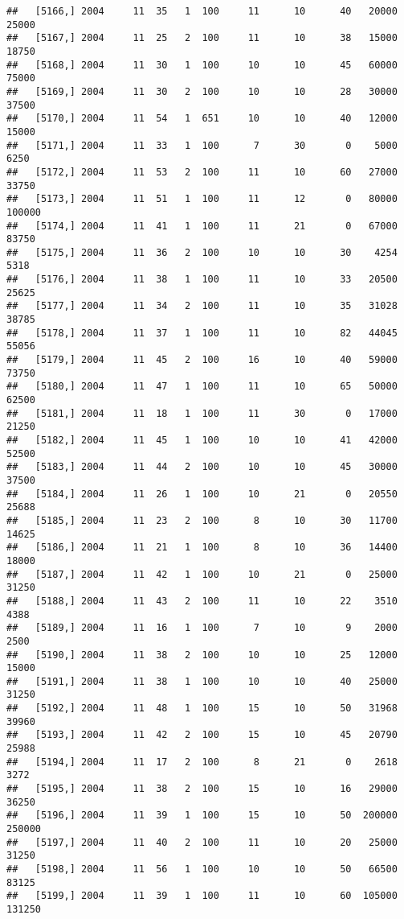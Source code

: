 \documentclass{article}\usepackage[]{graphicx}\usepackage[]{color}
\makeatletter
\newenvironment{kframe}{%
 \def\at@end@of@kframe{}%
 \ifinner\ifhmode%
  \def\at@end@of@kframe{\end{minipage}}%
  \begin{minipage}{\columnwidth}%
 \fi\fi%
 \def\FrameCommand##1{\hskip\@totalleftmargin \hskip-\fboxsep
 \colorbox{shadecolor}{##1}\hskip-\fboxsep
     \hskip-\linewidth \hskip-\@totalleftmargin \hskip\columnwidth}%
 \MakeFramed {\advance\hsize-\width
   \@totalleftmargin\z@ \linewidth\hsize
   \@setminipage}}%
 {\par\unskip\endMakeFramed%
 \at@end@of@kframe}
\newenvironment{knitrout}{}{} %
\makeatother
\begin{document}
\begin{knitrout}
\begin{kframe}
\begin{verbatim}
##   [5166,] 2004     11  35   1  100     11      10      40   20000   25000
##   [5167,] 2004     11  25   2  100     11      10      38   15000   18750
##   [5168,] 2004     11  30   1  100     10      10      45   60000   75000
##   [5169,] 2004     11  30   2  100     10      10      28   30000   37500
##   [5170,] 2004     11  54   1  651     10      10      40   12000   15000
##   [5171,] 2004     11  33   1  100      7      30       0    5000    6250
##   [5172,] 2004     11  53   2  100     11      10      60   27000   33750
##   [5173,] 2004     11  51   1  100     11      12       0   80000  100000
##   [5174,] 2004     11  41   1  100     11      21       0   67000   83750
##   [5175,] 2004     11  36   2  100     10      10      30    4254    5318
##   [5176,] 2004     11  38   1  100     11      10      33   20500   25625
##   [5177,] 2004     11  34   2  100     11      10      35   31028   38785
##   [5178,] 2004     11  37   1  100     11      10      82   44045   55056
##   [5179,] 2004     11  45   2  100     16      10      40   59000   73750
##   [5180,] 2004     11  47   1  100     11      10      65   50000   62500
##   [5181,] 2004     11  18   1  100     11      30       0   17000   21250
##   [5182,] 2004     11  45   1  100     10      10      41   42000   52500
##   [5183,] 2004     11  44   2  100     10      10      45   30000   37500
##   [5184,] 2004     11  26   1  100     10      21       0   20550   25688
##   [5185,] 2004     11  23   2  100      8      10      30   11700   14625
##   [5186,] 2004     11  21   1  100      8      10      36   14400   18000
##   [5187,] 2004     11  42   1  100     10      21       0   25000   31250
##   [5188,] 2004     11  43   2  100     11      10      22    3510    4388
##   [5189,] 2004     11  16   1  100      7      10       9    2000    2500
##   [5190,] 2004     11  38   2  100     10      10      25   12000   15000
##   [5191,] 2004     11  38   1  100     10      10      40   25000   31250
##   [5192,] 2004     11  48   1  100     15      10      50   31968   39960
##   [5193,] 2004     11  42   2  100     15      10      45   20790   25988
##   [5194,] 2004     11  17   2  100      8      21       0    2618    3272
##   [5195,] 2004     11  38   2  100     15      10      16   29000   36250
##   [5196,] 2004     11  39   1  100     15      10      50  200000  250000
##   [5197,] 2004     11  40   2  100     11      10      20   25000   31250
##   [5198,] 2004     11  56   1  100     10      10      50   66500   83125
##   [5199,] 2004     11  39   1  100     11      10      60  105000  131250

\end{verbatim}
\end{kframe}
\end{knitrout}
\end{document}
